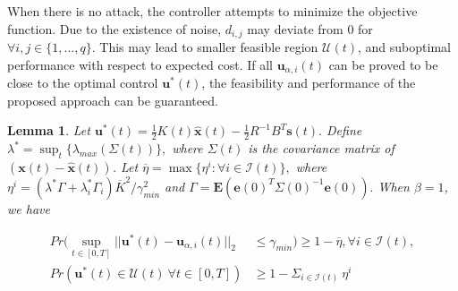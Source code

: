 \documentclass[journal]{IEEEtran}
\newtheorem{Lemma}{Lemma}
\begin{document}
When there is no attack, the controller attempts to minimize the objective function. Due to the existence of noise, $d_{i,j}$ may deviate from $0$ for $\forall i,j \in \{1,\ldots,q\}.$ This may lead to smaller feasible region $\mathcal{U}(t)$, and suboptimal performance with respect to expected cost. If all $\mathbf{u}_{\alpha,i}(t)$ can be proved to be close to the optimal control $\mathbf{u}^{\ast}(t)$, the feasibility and performance of the proposed approach can be guaranteed.


\begin{Lemma}
\label{lemma:feasibility-multi}
Let $\mathbf{u}^{\ast}(t) = \frac{1}{2}K(t)\hat{\mathbf{x}}(t) - \frac{1}{2}R^{-1}B^{T}\mathbf{s}(t).$ Define $\lambda^{\ast} = \sup_{t}{\{\lambda_{max}(\Sigma(t))\}},$ where $\Sigma(t)$ is the covariance matrix of $(\mathbf{x}(t)-\hat{\mathbf{x}}(t))$. Let $\overline{\eta} = \max\{\eta^i: \forall i \in \mathcal{I}(t)\},$ where $\eta^i = {(\lambda^{\ast}\Gamma + \lambda_{i}^{\ast}\Gamma_i)\overline{K}^{2}}/{\gamma_{min}^{2}}$ and $\Gamma = \mathbf{E}\left(\mathbf{e}(0)^T{\Sigma(0)}^{-1}\mathbf{e}(0)\right).$ When $\beta=1$, we have

\begin{align*}
    Pr(\sup_{t \in [0,T]}{||\mathbf{u}^{\ast}(t)-\mathbf{u}_{\alpha,i}(t)||_{2}} &\leq \gamma_{min}) \geq 1 - \overline{\eta}, \forall i \in \mathcal{I}(t), \\
    Pr\left(\mathbf{u}^{\ast}(t) \in \mathcal{U}(t) \ \forall t \in [0,T] \right) 
    &\geq 1 - \Sigma_{i \in \mathcal{I}(t) }  \ \eta^i
\end{align*}
\end{Lemma}
\end{document}
